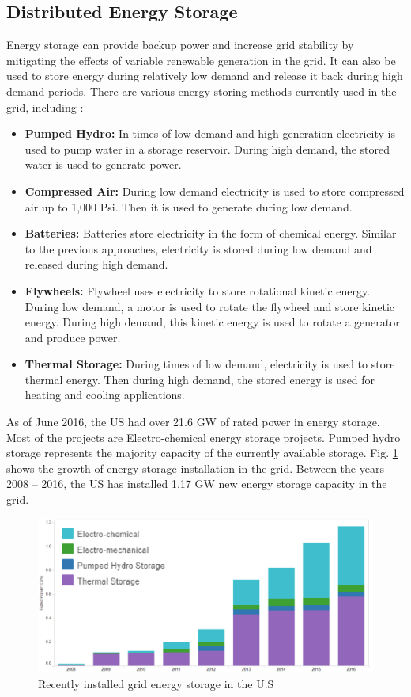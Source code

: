 \subsection{Distributed Energy Storage}
Energy storage can provide backup power and increase grid stability by mitigating the effects of variable renewable generation in the grid. It can also be used to store energy during relatively low demand and release it back during high demand periods. There are various energy storing methods currently used in the grid, including \cite{GE1}:
\begin{itemize}
    \item \textbf{Pumped Hydro:} In times of low demand and high generation electricity is used to pump water in a storage reservoir. During high demand, the stored water is used to generate power.
    \item \textbf{Compressed Air:} During low demand electricity is used to store compressed air up to 1,000 Psi. Then it is used to generate during low demand.
    \item \textbf{Batteries:} Batteries store electricity in the form of chemical energy. Similar to the previous approaches, electricity is stored during low demand and released during high demand.
    \item \textbf{Flywheels:} Flywheel uses electricity to store rotational kinetic energy. During low demand, a motor is used to rotate the flywheel and store kinetic energy. During high demand, this kinetic energy is used to rotate a generator and produce power.
    \item \textbf{Thermal Storage:} During times of low demand, electricity is used to store thermal energy. Then during high demand, the stored energy is used for heating and cooling applications.
\end{itemize}

As of June 2016, the US had over 21.6 GW of rated power in energy storage. Most of the projects are Electro-chemical energy storage projects. Pumped hydro storage represents the majority capacity of the currently available storage. Fig. \ref{fig:ES_INCREASE} shows the growth of energy storage installation in the grid. Between the years 2008 – 2016, the US has installed 1.17 GW new energy storage capacity in the grid. 

\begin{figure}[!h]
\centering
\includegraphics[width=0.85\linewidth]{figs/ES_INCREASE.png}
\caption[Recently installed grid energy storage in the U.S.]{Recently installed grid energy storage in the U.S \cite{GE2}}
\label{fig:ES_INCREASE}
\end{figure}


